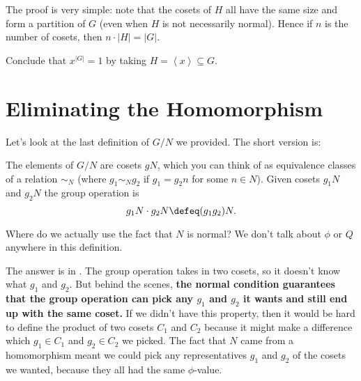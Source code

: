 The proof is very simple: note that the cosets of $H$ all have the same size and
form a partition of $G$ (even when $H$ is not necessarily normal).
Hence if $n$ is the number of cosets, then $n \cdot \left\lvert H \right\rvert = \left\lvert G \right\rvert$.

\begin{ques}
	Conclude that $x^{\left\lvert G \right\rvert}=1$
	by taking $H = \left<x\right> \subseteq G$.
\end{ques}


\section{Eliminating the Homomorphism}
Let's look at the last definition of $G/N$ we provided.
The short version is:
\begin{itemize}
	\ii The elements of $G/N$ are cosets $gN$, which you can think
	of as equivalence classes of a relation $\sim_N$
	(where $g_1 \sim_N g_2$ if $g_1 = g_2n$ for some $n \in N$).
	\ii Given cosets $g_1N$ and $g_2N$ the group operation is 
	\[ g_1N \cdot g_2N \defeq (g_1g_2)N. \]
\end{itemize}
Where do we actually use the fact that $N$ is normal?
We don't talk about $\phi$ or $Q$ anywhere in this definition.

The answer is in . The group operation takes in two cosets, so it doesn't know what $g_1$ and $g_2$.
But behind the scenes,
\textbf{the normal condition guarantees that the group operation can pick
any $g_1$ and $g_2$ it wants and still end up with the same coset.}
If we didn't have this property, then it would be hard to define the
product of two cosets $C_1$ and $C_2$ because it might make a difference
which $g_1 \in C_1$ and $g_2 \in C_2$ we picked.
The fact that $N$ came from a homomorphism meant we could pick any representatives
$g_1$ and $g_2$ of the cosets we wanted, because they all had the same $\phi$-value.

